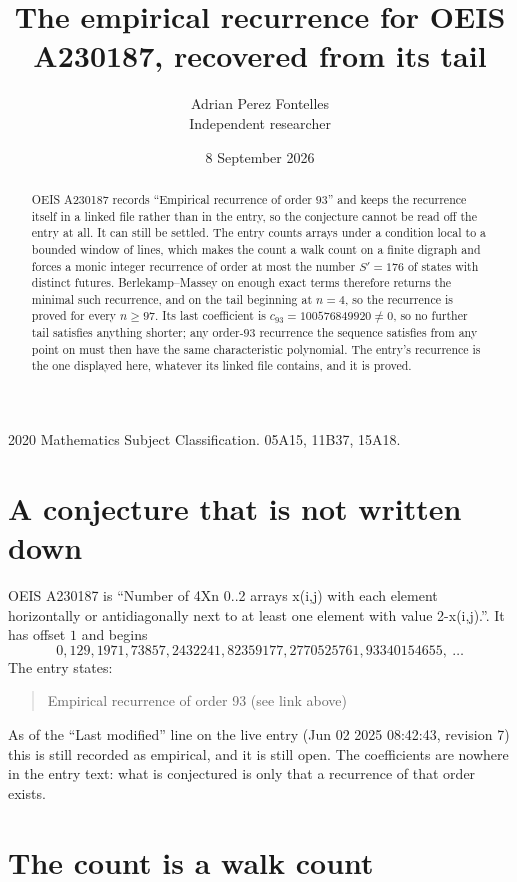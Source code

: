 \documentclass[11pt,a4paper]{article}
\title{The empirical recurrence for OEIS A230187, recovered from its tail}
\author{Adrian Perez Fontelles\\ \small Independent researcher}
\date{8 September 2026}
\theoremstyle{plain}
\theoremstyle{definition}
\begin{document}
\maketitle

\begin{abstract}
OEIS A230187 records ``Empirical recurrence of order $93$'' and keeps the recurrence itself in
a linked file rather than in the entry, so the conjecture cannot be read off the entry at all.
It can still be settled. The entry counts arrays under a condition local to a bounded window of
lines, which makes the count a walk count on a finite digraph and forces a monic integer
recurrence of order at most the number $S'=176$ of states with distinct futures. Berlekamp--Massey on
enough exact terms therefore returns the minimal such recurrence, and on the tail beginning at $n=4$, so the recurrence is proved for every $n\ge97$.
Its last coefficient is $c_{93}=100576849920\neq0$, so no further tail satisfies anything
shorter; any order-$93$ recurrence the sequence satisfies from any point on must then have
the same characteristic polynomial. The entry's recurrence is the one displayed here, whatever
its linked file contains, and it is proved.
\end{abstract}

\noindent\small 2020 Mathematics Subject Classification. 05A15, 11B37, 15A18.\normalsize

\section{A conjecture that is not written down}

OEIS A230187 is ``Number of 4Xn 0..2 arrays x(i,j) with each element horizontally or antidiagonally next to at least one element with value 2-x(i,j).''. It has offset $1$ and begins
\[
0, 129, 1971, 73857, 2432241, 82359177, 2770525761, 93340154655,\ \dots
\]
The entry states:
\begin{quote}
Empirical recurrence of order 93 (see link above)
\end{quote}
As of the ``Last modified'' line on the live entry (Jun 02 2025 08:42:43, revision 7)
this is still recorded as empirical, and it is still open. The coefficients are nowhere in the
entry text: what is conjectured is only that a recurrence of that order exists.

\section{The count is a walk count}
\end{document}
